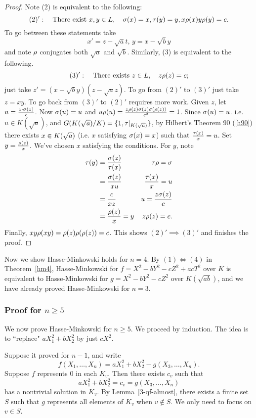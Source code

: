 \begin{proof}
Note (2) is equivalent to the following:
\[
(2)':\quad \text{There exist }x,y\in L,\quad \sigma(x)=x,\tau(y)=y, x\rho(x)y\rho(y)=c.
\]
To go between these statements take
\[
x'=z-\sqrt a t,\,y=x-\sqrt by
\]
and note $\rho$ conjugates both $\sqrt a$ and $\sqrt b$. Similarly, (3) is equivalent to the following.
\[
(3)': \quad \text{There exists }z\in L,\quad z\rho(z)=c;
\]
just take $z'=(x-\sqrt by)(z-\sqrt az)$. To go from $(2)'$ to $(3)'$ just take $z=xy$. To go back from $(3)'$ to $(2)'$ requires more work. Given $z$, let $u=\frac{z\cdot \sigma(z)}{c}$. Now $\sigma(u)=u$ and $u\rho(u)=\frac{z\rho(z)\sigma(z)\sigma(\rho(z))}{c^2}=1$. Since $\sigma(u)=u$. i.e. $u\in K(\sqrt a)$, and $G(K(\sqrt{a})/K)=\{1,\tau|_{K(\sqrt{a})}\}$, by Hilbert's Theorem 90 (\ref{h90}) there exists $x\in K(\sqrt{a})$ (i.e. $x$ satisfying $\sigma(x)=x$) such that $\frac{\tau(x)}{x}=u$. Set $y=\frac{\rho(z)}{x}$. We've chosen $x$ satisfying the conditions. For $y$, note
\begin{align*}
\tau(y)&=\frac{\sigma(z)}{\tau(x)}&\tau\rho=\sigma\\
&=\frac{\sigma(z)}{xu} &\frac{\tau(x)}{x}=u\\
&=\frac{c}{xz}&u=\frac{z\sigma(z)}{c}\\
&=\frac{\rho(z)}{x}=y&z\rho(z)=c.
\end{align*}
Finally, $xy\rho(xy)=\rho(z)\rho(\rho(z))=c$. This shows $(2)'\implies (3)'$ and finishes the proof.
\end{proof}
Now we show Hasse-Minkowski holds for $n=4$. By $(1)\iff (4)$ in Theorem~\ref{hm4}, Hasse-Minkowski for $f=X^2-bY^2-cZ^2+acT^2$ over $K$ is equivalent to Hasse-Minkowski for $g=X^2-bY^2-cZ^2$ over $K(\sqrt{ab})$,  and we have already proved Hasse-Minkowski for $n=3$.
\subsubsection{Proof for $n\ge 5$}
We now prove Hasse-Minkowski for $n\ge 5$. We proceed by induction. The idea is to ``replace" $aX_1^2+bX_2^2$ by just $cX^2$.

Suppose it proved for $n-1$, and write
\[
f(X_1,\ldots, X_n)=aX_1^2+bX_2^2-g(X_3,\ldots, X_n).
\]
Suppose $f$ represents 0 in each $K_v$. Then there exists $c_v$ such that
\[
aX_1^2+bX_2^2=c_v=g(X_3,\ldots, X_n)
\]
has a nontrivial solution in $K_v$. By Lemma~\ref{3-qf-almost}, there exists a finite set $S$ such that $g$ represents all elements of $K_v$ when $v\nin S$. We only need to focus on $v\in S$.

